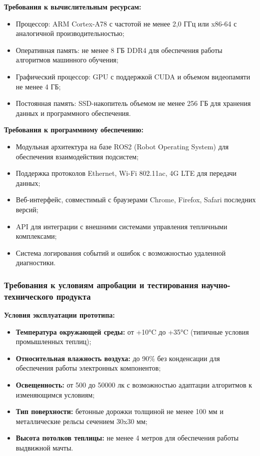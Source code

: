 \documentclass[12pt,a4paper]{article}
\begin{document}
\textbf{Требования к вычислительным ресурсам:}
\begin{itemize}
\item Процессор: ARM Cortex-A78 с частотой не менее 2,0 ГГц или x86-64 с аналогичной производительностью;
\item Оперативная память: не менее 8 ГБ DDR4 для обеспечения работы алгоритмов машинного обучения;
\item Графический процессор: GPU с поддержкой CUDA и объемом видеопамяти не менее 4 ГБ;
\item Постоянная память: SSD-накопитель объемом не менее 256 ГБ для хранения данных и программного обеспечения.
\end{itemize}

\textbf{Требования к программному обеспечению:}
\begin{itemize}
\item Модульная архитектура на базе ROS2 (Robot Operating System) для обеспечения взаимодействия подсистем;
\item Поддержка протоколов Ethernet, Wi-Fi 802.11ac, 4G LTE для передачи данных;
\item Веб-интерфейс, совместимый с браузерами Chrome, Firefox, Safari последних версий;
\item API для интеграции с внешними системами управления тепличными комплексами;
\item Система логирования событий и ошибок с возможностью удаленной диагностики.
\end{itemize}

\subsubsection{Требования к условиям апробации и тестирования научно-технического продукта}

\textbf{Условия эксплуатации прототипа:}
\begin{itemize}
\item \textbf{Температура окружающей среды:} от +10°C до +35°C (типичные условия промышленных теплиц);
\item \textbf{Относительная влажность воздуха:} до 90\% без конденсации для обеспечения работы электронных компонентов;
\item \textbf{Освещенность:} от 500 до 50000 лк с возможностью адаптации алгоритмов к изменяющимся условиям;
\item \textbf{Тип поверхности:} бетонные дорожки толщиной не менее 100 мм и металлические рельсы сечением 30x30 мм;
\item \textbf{Высота потолков теплицы:} не менее 4 метров для обеспечения работы выдвижной мачты.
\end{itemize}
\end{document}
